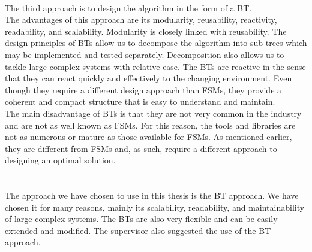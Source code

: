     \\
        The third approach is to design the algorithm in the form of a BT.\\
        The advantages of this approach are its modularity, reusability, reactivity, readability, and scalability. Modularity is closely linked with reusability. The design principles of BTs allow us to decompose the algorithm into sub-trees which may be implemented and tested separately. Decomposition also allows us to tackle large complex systems with relative ease. The BTs are reactive in the sense that they can react quickly and effectively to the changing environment. Even though they require a different design approach than FSMs, they provide a coherent and compact structure that is easy to understand and maintain.\\
        The main disadvantage of BTs is that they are not very common in the industry and are not as well known as FSMs. For this reason, the tools and libraries are not as numerous or mature as those available for FSMs. As mentioned earlier, they are different from FSMs and, as such, require a different approach to designing an optimal solution.\\\\
    \\
        The approach we have chosen to use in this thesis is the BT approach. We have chosen it for many reasons, mainly its scalability, readability, and maintainability of large complex systems. The BTs are also very flexible and can be easily extended and modified. The supervisor also suggested the use of the BT approach.
        